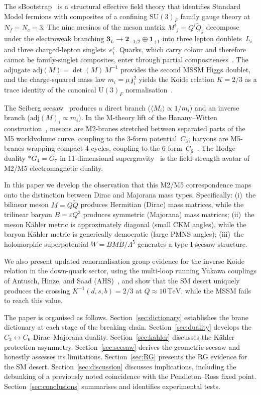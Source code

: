\documentclass[aps,prd,twocolumn,showpacs,preprintnumbers,superscriptaddress,floatfix]{revtex4-2}
\newcommand{\SU}{\mathrm{SU}}
\newcommand{\UU}{\mathrm{U}}
\newcommand{\Nf}{N_{\!f}}
\newcommand{\Nc}{N_{\!c}}
\newcommand{\adj}{\mathrm{adj}}
\newcommand{\TeV}{\,\mathrm{TeV}}
\newcommand{\zch}{\mathfrak{z}}
\begin{document}
The sBootstrap~\cite{Rivero:2005b,Rivero:2024epjc} is a structural
effective field theory that identifies Standard Model fermions with
composites of a confining $\SU(3)_F$ family gauge theory at
$\Nf = \Nc = 3$.
The nine mesinos of the meson matrix
$M^i{}_j = Q^i\tilde{Q}_j$ decompose under the electroweak
branching $\mathbf{3}_L \to \mathbf{2}_{-1/2} \oplus
\mathbf{1}_{+1}$ into three lepton doublets~$L_i$ and three
charged-lepton singlets~$e^c_i$.
Quarks, which carry colour and therefore cannot be family-singlet
composites, enter through partial
compositeness~\cite{Kaplan:1991dc}.
The adjugate $\adj(M) = \det(M)\,M^{-1}$ provides the second
MSSM Higgs doublet, and the charge-squared mass law
$m_i = \mu\,\zch_i^2$ yields the Koide relation
$K = 2/3$ as a trace identity of the canonical
$\UU(3)_F$ normalisation~\cite{Rivero:2024epjc}.

The Seiberg seesaw~\cite{Seiberg:1994bz} produces a direct branch
($\langle M_i \rangle \propto 1/m_i$) and an inverse branch
($\adj(M)_i \propto m_i$).
In the M-theory lift of the Hanany--Witten
construction~\cite{HananyWitten:1997}, mesons are M2-branes
stretched between separated parts of the M5 worldvolume curve,
coupling to the 3-form potential~$C_3$; baryons are M5-branes
wrapping compact 4-cycles, coupling to the
6-form~$C_6$~\cite{Witten:1997M5,Witten:1998baryon}.
The Hodge duality $*G_4 = G_7$ in 11-dimensional
supergravity~\cite{CremmerJuliaScherk:1978} is the field-strength
avatar of M2/M5 electromagnetic duality.

In this paper we develop the observation that this M2/M5
correspondence maps onto the distinction between Dirac and Majorana
mass types.
Specifically:
(i)~the bilinear meson $M = Q\tilde{Q}$ produces Hermitian (Dirac)
mass matrices, while the trilinear baryon $B = \varepsilon Q^3$
produces symmetric (Majorana) mass matrices;
(ii)~the meson K\"ahler metric is approximately diagonal (small CKM
angles), while the baryon K\"ahler metric is generically democratic
(large PMNS angles);
(iii)~the holomorphic superpotential
$W = BM\tilde{B}/\Lambda^5$ generates a type-I seesaw structure.

We also present updated renormalisation group evidence for the
inverse Koide relation in the down-quark sector, using the
multi-loop running Yukawa couplings of Antusch, Hinze, and
Saad (AHS)~\cite{AHS:2024}, and show that the SM desert
uniquely produces the crossing $K^{-1}(d,s,b) = 2/3$ at
$Q \approx 10\TeV$, while the MSSM fails to reach this value.

The paper is organised as follows.
Section~\ref{sec:dictionary} establishes the brane dictionary at
each stage of the breaking chain.
Section~\ref{sec:duality} develops the $C_3 \leftrightarrow C_6$
Dirac--Majorana duality.
Section~\ref{sec:kahler} discusses the K\"ahler protection
asymmetry.
Section~\ref{sec:seesaw} derives the geometric seesaw and
honestly assesses its limitations.
Section~\ref{sec:RG} presents the RG evidence for the SM desert.
Section~\ref{sec:discussion} discusses implications, including
the debunking of a previously noted coincidence with the
Pendleton--Ross fixed point.
Section~\ref{sec:conclusions} summarises and identifies
experimental tests.
\end{document}
